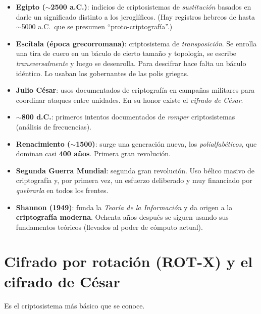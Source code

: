 \documentclass[11pt,a4paper]{article}
\begin{document}
\begin{itemize}[leftmargin=1.4em,itemsep=2pt]
  \item \textbf{Egipto ($\sim$2500 a.C.)}: indicios de criptosistemas de \emph{sustitución}
        basados en darle un significado distinto a los jeroglíficos. (Hay registros hebreos
        de hasta $\sim$5000 a.C.\ que se presumen ``proto-criptografía''.)
  \item \textbf{Escítala (época grecorromana)}: criptosistema de \emph{transposición}. Se
        enrolla una tira de cuero en un báculo de cierto tamaño y topología, se escribe
        \emph{transversalmente} y luego se desenrolla. Para descifrar hace falta un báculo
        idéntico. Lo usaban los gobernantes de las polis griegas.
  \item \textbf{Julio César}: usos documentados de criptografía en campañas militares para
        coordinar ataques entre unidades. En su honor existe el \emph{cifrado de César}.
  \item \textbf{$\sim$800 d.C.}: primeros intentos documentados de \emph{romper}
        criptosistemas (análisis de frecuencias).
  \item \textbf{Renacimiento ($\sim$1500)}: surge una generación nueva, los
        \emph{polialfabéticos}, que dominan casi \textbf{400 años}. Primera gran revolución.
  \item \textbf{Segunda Guerra Mundial}: segunda gran revolución. Uso bélico masivo de
        criptografía y, por primera vez, un esfuerzo deliberado y muy financiado por
        \emph{quebrarla} en todos los frentes.
  \item \textbf{Shannon (1949)}: funda la \emph{Teoría de la Información} y da origen a la
        \textbf{criptografía moderna}. Ochenta años después se siguen usando sus fundamentos
        teóricos (llevados al poder de cómputo actual).
\end{itemize}

\section{Cifrado por rotación (ROT-X) y el cifrado de César}

Es el criptosistema más básico que se conoce.
\end{document}
